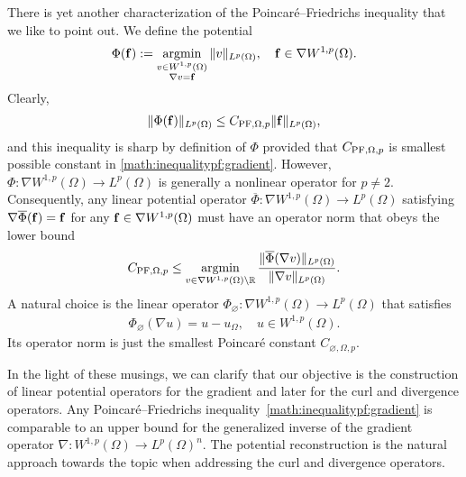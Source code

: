 \documentclass[a4paper]{amsart}
\begin{document}
There is yet another characterization of the Poincar\'e--Friedrichs inequality that we like to point out. 
We define the potential 
\begin{align*}
    \Phi( {\mathbf f} ) := \operatorname*{{\rm argmin}}\limits_{ \substack{ v \in W^{1,p}(\Omega) \\ \nabla v = {\mathbf f} } } \| v \|_{L^{p}(\Omega)},
    \quad 
    {\mathbf f} \in \nabla W^{1,p}(\Omega)
    .
\end{align*}
Clearly, 
\begin{align*}
    \| \Phi({\mathbf f}) \|_{L^p(\Omega)} \leq C_{{\rm PF},\Omega,p} \| {\mathbf f} \|_{L^p(\Omega)},
\end{align*}
and this inequality is sharp by definition of $\Phi$ provided that $C_{{\rm PF},\Omega,p}$ is smallest possible constant in \eqref{math:inequalitypf:gradient}. 
However, $\Phi : \nabla W^{1,p}(\Omega) \rightarrow L^p(\Omega)$ is generally a nonlinear operator for $p \neq 2$. 
Consequently, any linear potential operator $\overline\Phi : \nabla W^{1,p}(\Omega) \rightarrow L^p(\Omega)$
satisfying $\nabla \overline\Phi( {\mathbf f} ) = {\mathbf f}$ for any ${\mathbf f} \in \nabla W^{1,p}(\Omega)$ must have an operator norm that obeys the lower bound 
\begin{align*}
    C_{{\rm PF},\Omega,p} 
    \leq 
    \operatorname*{{\rm argmin}}\limits_{ v \in \nabla W^{1,p}(\Omega) \setminus {\mathbb R} } 
    \frac{ \| \overline\Phi(\nabla v) \|_{L^p(\Omega)} }{ \| \nabla v \|_{L^p(\Omega)} }
    .
\end{align*}
A natural choice is the linear operator $\Phi_{\varnothing} : \nabla W^{1,p}(\Omega) \rightarrow L^p(\Omega)$ that satisfies 
\begin{align*}
    \Phi_{\varnothing}( \nabla u ) = u - u_{\Omega},
    \quad 
    u \in W^{1,p}(\Omega)
    .
\end{align*}
Its operator norm is just the smallest Poincar\'e constant $C_{\varnothing,\Omega,p}$.

In the light of these musings, we can clarify that our objective is the construction of linear potential operators for the gradient and later for the curl and divergence operators. 
Any Poincar\'e--Friedrichs inequality~\eqref{math:inequalitypf:gradient} is comparable to an upper bound for the generalized inverse of the gradient operator $\nabla : W^{1,p}(\Omega) \rightarrow L^{p}(\Omega)^{n}$. The potential reconstruction is the natural approach towards the topic when addressing the curl and divergence operators. 
\end{document}
